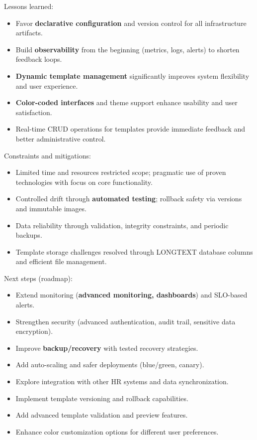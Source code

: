 \documentclass[a4paper,12pt]{report}
\begin{document}
\begin{doublespace}
Lessons learned:
\begin{itemize}
    \item Favor \textbf{declarative configuration} and version control for all infrastructure artifacts.
    \item Build \textbf{observability} from the beginning (metrics, logs, alerts) to shorten feedback loops.
    \item \textbf{Dynamic template management} significantly improves system flexibility and user experience.
    \item \textbf{Color-coded interfaces} and theme support enhance usability and user satisfaction.
    \item Real-time CRUD operations for templates provide immediate feedback and better administrative control.
\end{itemize}

Constraints and mitigations:
\begin{itemize}
    \item Limited time and resources restricted scope; pragmatic use of proven technologies with focus on core functionality.
    \item Controlled drift through \textbf{automated testing}; rollback safety via versions and immutable images.
    \item Data reliability through validation, integrity constraints, and periodic backups.
    \item Template storage challenges resolved through LONGTEXT database columns and efficient file management.
\end{itemize}

Next steps (roadmap):
\begin{itemize}
    \item Extend monitoring (\textbf{advanced monitoring, dashboards}) and SLO-based alerts.
    \item Strengthen security (advanced authentication, audit trail, sensitive data encryption).
    \item Improve \textbf{backup/recovery} with tested recovery strategies.
    \item Add auto-scaling and safer deployments (blue/green, canary).
    \item Explore integration with other HR systems and data synchronization.
    \item Implement template versioning and rollback capabilities.
    \item Add advanced template validation and preview features.
    \item Enhance color customization options for different user preferences.
\end{itemize}


\end{doublespace}
\end{document}
